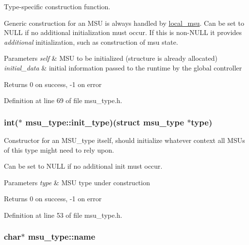 Type-\/specific construction function. 

Generic construction for an M\-S\-U is always handled by \hyperlink{structlocal__msu}{local\-\_\-msu}. Can be set to N\-U\-L\-L if no additional initialization must occur. If this is non-\/\-N\-U\-L\-L it provides {\itshape additional} initialization, such as construction of msu state. 
\begin{DoxyParams}{Parameters}
{\em self} & M\-S\-U to be initialized (structure is already allocated) \\
\hline
{\em initial\-\_\-data} & initial information passed to the runtime by the global controller \\
\hline
\end{DoxyParams}
\begin{DoxyReturn}{Returns}
0 on success, -\/1 on error 
\end{DoxyReturn}


Definition at line 69 of file msu\-\_\-type.\-h.

\hypertarget{structmsu__type_a5dd9b478727fefecff8cf16525003135}{
\subsubsection[{init\-\_\-type}]{\setlength{\rightskip}{0pt plus 5cm}int($\ast$ msu\-\_\-type\-::init\-\_\-type)(struct {\bf msu\-\_\-type} $\ast$type)}}\label{structmsu__type_a5dd9b478727fefecff8cf16525003135}


Constructor for an M\-S\-U\-\_\-type itself, should initialize whatever context all M\-S\-Us of this type might need to rely upon. 

Can be set to N\-U\-L\-L if no additional init must occur. 
\begin{DoxyParams}{Parameters}
{\em type} & M\-S\-U type under construction \\
\hline
\end{DoxyParams}
\begin{DoxyReturn}{Returns}
0 on success, -\/1 on error 
\end{DoxyReturn}


Definition at line 53 of file msu\-\_\-type.\-h.

\hypertarget{structmsu__type_ade4e1d9d98f0e22f3a54986919b07665}{
\subsubsection[{name}]{\setlength{\rightskip}{0pt plus 5cm}char$\ast$ msu\-\_\-type\-::name}}\label{structmsu__type_ade4e1d9d98f0e22f3a54986919b07665}


